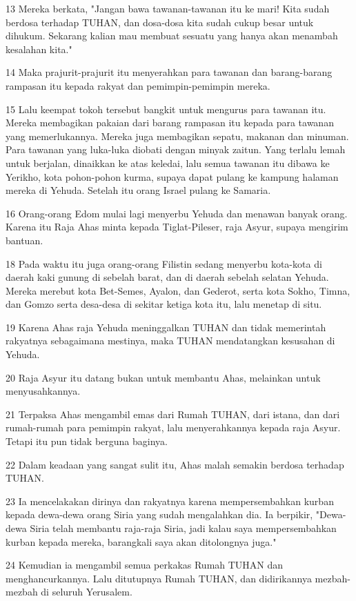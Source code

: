 \par 13 Mereka berkata, "Jangan bawa tawanan-tawanan itu ke mari! Kita sudah berdosa terhadap TUHAN, dan dosa-dosa kita sudah cukup besar untuk dihukum. Sekarang kalian mau membuat sesuatu yang hanya akan menambah kesalahan kita."
\par 14 Maka prajurit-prajurit itu menyerahkan para tawanan dan barang-barang rampasan itu kepada rakyat dan pemimpin-pemimpin mereka.
\par 15 Lalu keempat tokoh tersebut bangkit untuk mengurus para tawanan itu. Mereka membagikan pakaian dari barang rampasan itu kepada para tawanan yang memerlukannya. Mereka juga membagikan sepatu, makanan dan minuman. Para tawanan yang luka-luka diobati dengan minyak zaitun. Yang terlalu lemah untuk berjalan, dinaikkan ke atas keledai, lalu semua tawanan itu dibawa ke Yerikho, kota pohon-pohon kurma, supaya dapat pulang ke kampung halaman mereka di Yehuda. Setelah itu orang Israel pulang ke Samaria.
\par 16 Orang-orang Edom mulai lagi menyerbu Yehuda dan menawan banyak orang. Karena itu Raja Ahas minta kepada Tiglat-Pileser, raja Asyur, supaya mengirim bantuan.
\par 18 Pada waktu itu juga orang-orang Filistin sedang menyerbu kota-kota di daerah kaki gunung di sebelah barat, dan di daerah sebelah selatan Yehuda. Mereka merebut kota Bet-Semes, Ayalon, dan Gederot, serta kota Sokho, Timna, dan Gomzo serta desa-desa di sekitar ketiga kota itu, lalu menetap di situ.
\par 19 Karena Ahas raja Yehuda meninggalkan TUHAN dan tidak memerintah rakyatnya sebagaimana mestinya, maka TUHAN mendatangkan kesusahan di Yehuda.
\par 20 Raja Asyur itu datang bukan untuk membantu Ahas, melainkan untuk menyusahkannya.
\par 21 Terpaksa Ahas mengambil emas dari Rumah TUHAN, dari istana, dan dari rumah-rumah para pemimpin rakyat, lalu menyerahkannya kepada raja Asyur. Tetapi itu pun tidak berguna baginya.
\par 22 Dalam keadaan yang sangat sulit itu, Ahas malah semakin berdosa terhadap TUHAN.
\par 23 Ia mencelakakan dirinya dan rakyatnya karena mempersembahkan kurban kepada dewa-dewa orang Siria yang sudah mengalahkan dia. Ia berpikir, "Dewa-dewa Siria telah membantu raja-raja Siria, jadi kalau saya mempersembahkan kurban kepada mereka, barangkali saya akan ditolongnya juga."
\par 24 Kemudian ia mengambil semua perkakas Rumah TUHAN dan menghancurkannya. Lalu ditutupnya Rumah TUHAN, dan didirikannya mezbah-mezbah di seluruh Yerusalem.
